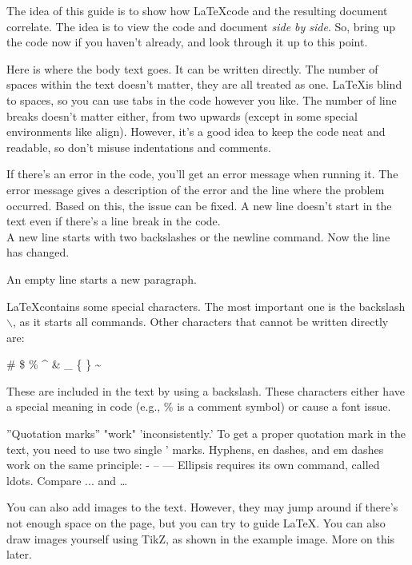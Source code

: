 \documentclass[12pt, titlepage, a4paper]{article}  %
\begin{document}
The idea of this guide is to show how \LaTeX code and the resulting document correlate. The idea is to view the code and document \emph{side by side}. So, bring up the code now if you haven’t already, and look through it up to this point.

Here is where the body text goes. It can be written directly. The number of spaces within the text doesn’t matter, they are all treated as one. \LaTeX is blind to spaces, so you can use tabs in the code however you like. The number of line breaks doesn’t matter either, from two upwards (except in some special environments like align). However, it’s a good idea to keep the code neat and readable, so don’t misuse indentations and comments.

If there’s an error in the code, you’ll get an error message when running it. The error message gives a description of the error and the line where the problem occurred. Based on this, the issue can be fixed.
A new line doesn’t start in the text even if there’s a line break in the code. \\
A new line starts with two backslashes or the newline command. \newline Now the line has changed.

An empty line starts a new paragraph.

\LaTeX contains some special characters. The most important one is the backslash $\backslash$, as it starts all commands. Other characters that cannot be written directly are:

\# \$ \% \^{} \& \_ \{ \} \~{} 

These are included in the text by using a backslash. These characters either have a special meaning in code (e.g., \% is a comment symbol) or cause a font issue.

''Quotation marks'' "work" 'inconsistently.' To get a proper quotation mark in the text, you need to use two single ' marks.
Hyphens, en dashes, and em dashes work on the same principle: - -- ---
Ellipsis requires its own command, called ldots. Compare ... and \ldots

You can also add images to the text. However, they may jump around if there’s not enough space on the page, but you can try to guide \LaTeX.
You can also draw images yourself using TikZ, as shown in the example image. More on this later.

\end{document}
